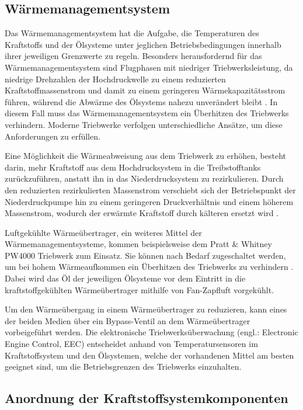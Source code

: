 \subsection{Wärmemanagementsystem}

Das Wärmemanagementsystem hat die Aufgabe, die Temperaturen des Kraftstoffs und der Ölsysteme unter jeglichen Betriebsbedingungen innerhalb ihrer jeweiligen Grenzwerte zu regeln. Besonders herausfordernd für das Wärmemanagementsystem sind Flugphasen mit niedriger Triebwerksleistung, da niedrige Drehzahlen der Hochdruckwelle zu einem reduzierten Kraftstoffmassenstrom und damit zu einem geringeren Wärmekapazitätsstrom führen, während die Abwärme des Ölsystems nahezu unverändert bleibt \cite{Braunling.2015}. In diesem Fall muss das Wärmemanagementsystem ein Überhitzen des Triebwerks verhindern. Moderne Triebwerke verfolgen unterschiedliche Ansätze, um diese Anforderungen zu erfüllen. 

Eine Möglichkeit die Wärmeabweisung aus dem Triebwerk zu erhöhen, besteht darin, mehr Kraftstoff aus dem Hochdrucksystem in die Treibstofftanks zurückzuführen, anstatt ihn in das Niederdrucksystem zu rezirkulieren. Durch den reduzierten rezirkulierten Massenstrom verschiebt sich der Betriebspunkt der Niederdruckpumpe hin zu einem geringeren Druckverhältnis und einem höherem Massenstrom, wodurch der erwärmte Kraftstoff durch kälteren  ersetzt wird \cite{LinkeDiesinger.2014}. 

Luftgekühlte Wärmeübertrager, ein weiteres Mittel der Wärmemanagementsysteme, kommen beispielsweise dem Pratt \& Whitney PW4000 Triebwerk zum Einsatz. Sie können nach Bedarf zugeschaltet werden, um bei hohem Wärmeaufkommen ein Überhitzen des Triebwerks zu verhindern \cite{LinkeDiesinger.2014}. Dabei wird das Öl der jeweiligen Ölsysteme vor dem Eintritt in die kraftstoffgekühlten Wärmeübertrager mithilfe von Fan-Zapfluft vorgekühlt. 

Um den Wärmeübergang in einem Wärmeübertrager zu reduzieren, kann eines der beiden Medien über ein Bypass-Ventil an dem Wärmeübertrager vorbeigeführt werden. Die elektronische Triebwerksüberwachung (engl.: Electronic Engine Control, EEC) entscheidet anhand von Temperatursensoren im Kraftstoffsystem und den Ölsystemen, welche der vorhandenen Mittel am besten geeignet sind, um die Betriebsgrenzen des Triebwerks einzuhalten. \cite{LinkeDiesinger.2014}

\subsection{Anordnung der Kraftstoffsystemkomponenten}

